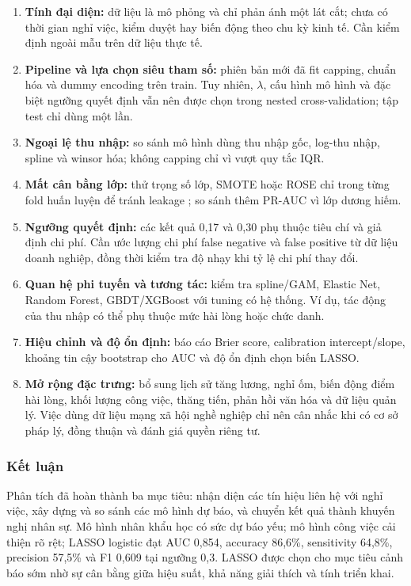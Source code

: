 \begin{enumerate}
  \item \textbf{Tính đại diện:} dữ liệu là mô phỏng và chỉ phản ánh một
  lát cắt; chưa có thời gian nghỉ việc, kiểm duyệt hay biến động theo
  chu kỳ kinh tế. Cần kiểm định ngoài mẫu trên dữ liệu thực tế.
  \item \textbf{Pipeline và lựa chọn siêu tham số:} phiên bản mới đã fit
  capping, chuẩn hóa và dummy encoding trên train. Tuy nhiên,
  \(\lambda\), cấu hình mô hình và đặc biệt ngưỡng quyết định vẫn nên
  được chọn trong nested cross-validation; tập test chỉ dùng một lần.
  \item \textbf{Ngoại lệ thu nhập:} so sánh mô hình dùng thu nhập gốc,
  log-thu nhập, spline và winsor hóa; không capping chỉ vì vượt quy tắc
  IQR.
  \item \textbf{Mất cân bằng lớp:} thử trọng số lớp, SMOTE hoặc ROSE chỉ
  trong từng fold huấn luyện để tránh leakage \cite{chawla2002}; so sánh
  thêm PR-AUC vì lớp dương hiếm.
  \item \textbf{Ngưỡng quyết định:} các kết quả 0,17 và 0,30 phụ
  thuộc tiêu chí và giả định chi phí. Cần ước lượng chi phí false negative
  và false positive từ dữ liệu doanh nghiệp, đồng thời kiểm tra độ nhạy
  khi tỷ lệ chi phí thay đổi.
  \item \textbf{Quan hệ phi tuyến và tương tác:} kiểm tra spline/GAM,
  Elastic Net, Random Forest, GBDT/XGBoost với tuning có hệ thống. Ví dụ,
  tác động của thu nhập có thể phụ thuộc mức hài lòng hoặc chức danh.
  \item \textbf{Hiệu chỉnh và độ ổn định:} báo cáo Brier score,
  calibration intercept/slope, khoảng tin cậy bootstrap cho AUC và độ
  ổn định chọn biến LASSO.
  \item \textbf{Mở rộng đặc trưng:} bổ sung lịch sử tăng lương, nghỉ ốm,
  biến động điểm hài lòng, khối lượng công việc, thăng tiến, phản hồi văn
  hóa và dữ liệu quản lý. Việc dùng dữ liệu mạng xã hội nghề nghiệp chỉ
  nên cân nhắc khi có cơ sở pháp lý, đồng thuận và đánh giá quyền riêng tư.
\end{enumerate}

\subsubsection{Kết luận}

Phân tích đã hoàn thành ba mục tiêu: nhận diện các tín hiệu liên hệ với
nghỉ việc, xây dựng và so sánh các mô hình dự báo, và chuyển kết quả
thành khuyến nghị nhân sự. Mô hình nhân khẩu học có sức dự báo yếu; mô
hình công việc cải thiện rõ rệt; LASSO logistic đạt AUC 0,854,
accuracy 86,6\%, sensitivity 64,8\%, precision 57,5\% và F1 0,609 tại
ngưỡng 0,3. LASSO được chọn cho mục tiêu cảnh báo sớm nhờ sự cân bằng
giữa hiệu suất, khả năng giải thích và tính triển khai.

